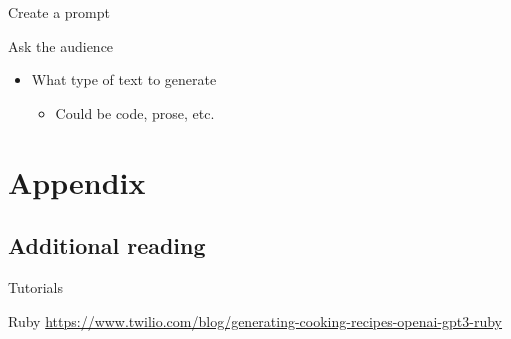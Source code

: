 \documentclass[presentation]{beamer}
\begin{document}
\begin{frame}[label={sec:orgcd9392f}]{Create a prompt}
\begin{block}{Ask the audience}
\begin{itemize}
\item What type of text to generate
\begin{itemize}
\item Could be code, prose, etc.
\end{itemize}
\end{itemize}
\end{block}
\end{frame}

\section{Appendix}
\label{sec:orgea88a13}
\subsection{Additional reading}
\label{sec:orgb1f509b}
\begin{frame}[label={sec:org185613d}]{Tutorials}
\begin{block}{Ruby}
{\footnotesize
\url{https://www.twilio.com/blog/generating-cooking-recipes-openai-gpt3-ruby}
}
\end{block}
\end{frame}
\end{document}

